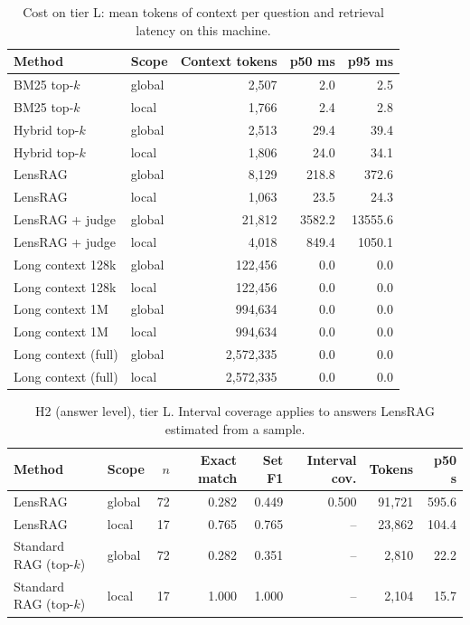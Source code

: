 \documentclass[11pt]{article}
\begin{document}
\begin{table}[htbp]
\centering\small
\caption{Cost on tier L: mean tokens of context per question and retrieval latency on this machine.}
\label{tab:cost}
\begin{tabular}{llrrr}
\toprule
Method & Scope & Context tokens & p50 ms & p95 ms \\
\midrule
BM25 top-$k$ & global & 2,507 & 2.0 & 2.5 \\
BM25 top-$k$ & local & 1,766 & 2.4 & 2.8 \\
Hybrid top-$k$ & global & 2,513 & 29.4 & 39.4 \\
Hybrid top-$k$ & local & 1,806 & 24.0 & 34.1 \\
LensRAG & global & 8,129 & 218.8 & 372.6 \\
LensRAG & local & 1,063 & 23.5 & 24.3 \\
LensRAG + judge & global & 21,812 & 3582.2 & 13555.6 \\
LensRAG + judge & local & 4,018 & 849.4 & 1050.1 \\
Long context 128k & global & 122,456 & 0.0 & 0.0 \\
Long context 128k & local & 122,456 & 0.0 & 0.0 \\
Long context 1M & global & 994,634 & 0.0 & 0.0 \\
Long context 1M & local & 994,634 & 0.0 & 0.0 \\
Long context (full) & global & 2,572,335 & 0.0 & 0.0 \\
Long context (full) & local & 2,572,335 & 0.0 & 0.0 \\
\bottomrule
\end{tabular}
\end{table}

\begin{table}[htbp]
\centering\small
\caption{H2 (answer level), tier L. Interval coverage applies to answers LensRAG estimated from a sample.}
\label{tab:h2ans}
\begin{tabular}{llrrrrrr}
\toprule
Method & Scope & $n$ & Exact match & Set F1 & Interval cov. & Tokens & p50 s \\
\midrule
LensRAG & global & 72 & 0.282 & 0.449 & 0.500 & 91,721 & 595.6 \\
LensRAG & local & 17 & 0.765 & 0.765 & -- & 23,862 & 104.4 \\
Standard RAG (top-$k$) & global & 72 & 0.282 & 0.351 & -- & 2,810 & 22.2 \\
Standard RAG (top-$k$) & local & 17 & 1.000 & 1.000 & -- & 2,104 & 15.7 \\
\bottomrule
\end{tabular}
\end{table}
\end{document}
